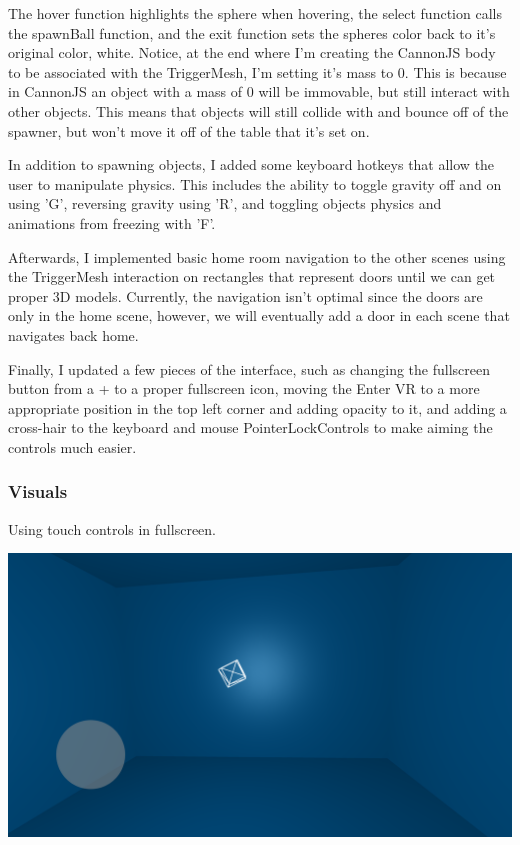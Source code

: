 \documentclass[onecolumn, draftclsnofoot,10pt, compsoc]{IEEEtran}
\begin{document}
The hover function highlights the sphere when hovering, the select function calls the spawnBall function, and the exit function sets the spheres color back to it's original color, white. Notice, at the end where I'm creating the CannonJS body to be associated with the TriggerMesh, I'm setting it's mass to 0. This is because in CannonJS an object with a mass of 0 will be immovable, but still interact with other objects. This means that objects will still collide with and bounce off of the spawner, but won't move it off of the table that it's set on.

In addition to spawning objects, I added some keyboard hotkeys that allow the user to manipulate physics. This includes the ability to toggle gravity off and on using 'G', reversing gravity using 'R', and toggling objects physics and animations from freezing with 'F'.

Afterwards, I implemented basic home room navigation to the other scenes using the TriggerMesh interaction on rectangles that represent doors until we can get proper 3D models. Currently, the navigation isn't optimal since the doors are only in the home scene, however, we will eventually add a door in each scene that navigates back home.

Finally, I updated a few pieces of the interface, such as changing the fullscreen button from a + to a proper fullscreen icon, moving the Enter VR to a more appropriate position in the top left corner and adding opacity to it, and adding a cross-hair to the keyboard and mouse PointerLockControls to make aiming the controls much easier.

\subsubsection{Visuals}
Using touch controls in fullscreen.

\includegraphics[width=\linewidth]{images/JoystickFullscreen.png}
\end{document}
